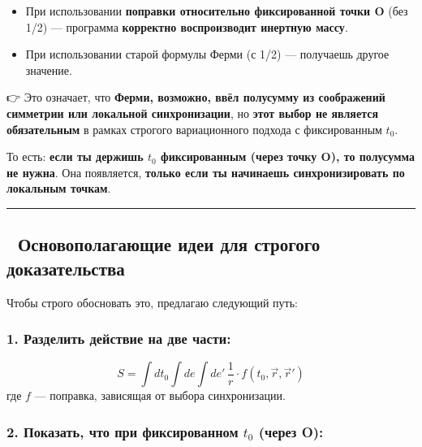 \documentclass[11pt]{article}
\providecommand{\tightlist}{%
      \setlength{\itemsep}{0pt}\setlength{\parskip}{0pt}}
\begin{document}
\begin{itemize}
\tightlist
\item
  При использовании \textbf{поправки относительно фиксированной точки O}
  (без 1/2) --- программа \textbf{корректно воспроизводит инертную
  массу}.
\item
  При использовании старой формулы Ферми (с 1/2) --- получаешь другое
  значение.
\end{itemize}

👉 Это означает, что \textbf{Ферми, возможно, ввёл полусумму из
соображений симметрии или локальной синхронизации}, но \textbf{этот
выбор не является обязательным} в рамках строгого вариационного подхода
с фиксированным \(t_0\).

То есть: \textbf{если ты держишь \(t_0\) фиксированным (через точку O),
то полусумма не нужна}. Она появляется, \textbf{только если ты начинаешь
синхронизировать по локальным точкам}.

\begin{center}\rule{0.5\linewidth}{\linethickness}\end{center}

\subsection{🧠 Основополагающие идеи для строгого
доказательства}\label{ux43eux441ux43dux43eux432ux43eux43fux43eux43bux430ux433ux430ux44eux449ux438ux435-ux438ux434ux435ux438-ux434ux43bux44f-ux441ux442ux440ux43eux433ux43eux433ux43e-ux434ux43eux43aux430ux437ux430ux442ux435ux43bux44cux441ux442ux432ux430}

Чтобы строго обосновать это, предлагаю следующий путь:

\subsubsection{\texorpdfstring{1. \textbf{Разделить действие на две
части}:}{1. Разделить действие на две части:}}\label{ux440ux430ux437ux434ux435ux43bux438ux442ux44c-ux434ux435ux439ux441ux442ux432ux438ux435-ux43dux430-ux434ux432ux435-ux447ux430ux441ux442ux438}

\[
S = \int dt_0 \int de \int de'\, \frac{1}{r} \cdot f(t_0, \vec{r}, \vec{r}')
\] где \(f\) --- поправка, зависящая от выбора синхронизации.

\subsubsection{\texorpdfstring{2. \textbf{Показать, что при
фиксированном \(t_0\)} (через
O):}{2. Показать, что при фиксированном t\_0 (через O):}}\label{ux43fux43eux43aux430ux437ux430ux442ux44c-ux447ux442ux43e-ux43fux440ux438-ux444ux438ux43aux441ux438ux440ux43eux432ux430ux43dux43dux43eux43c-t_0-ux447ux435ux440ux435ux437-o}
\end{document}
